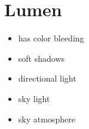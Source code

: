     \section{Lumen}
        \begin{itemize}
            \item has color bleeding
            \item soft shadows
        \end{itemize}

        \begin{itemize}
            \item directional light
            \item sky light
            \item sky atmosphere
        \end{itemize}